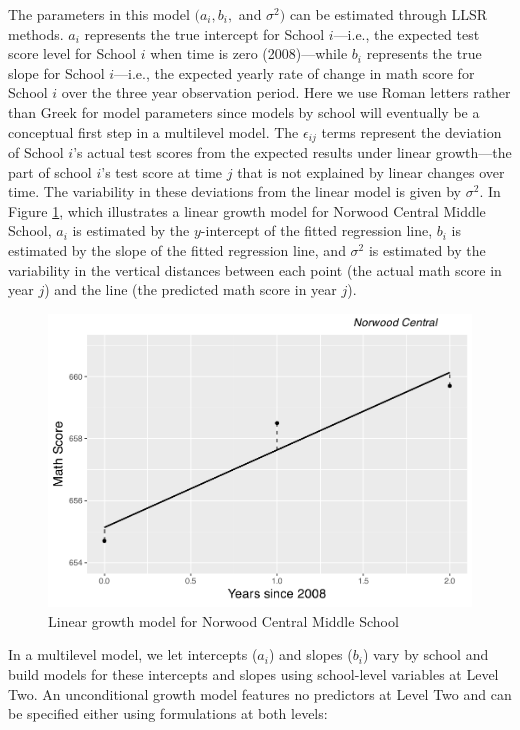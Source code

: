 \documentclass[
]{krantz}
\begin{document}
The parameters in this model \((a_{i}, b_{i},\) and \(\sigma^2)\) can be estimated through LLSR methods. \(a_{i}\) represents the true intercept for School \(i\)---i.e., the expected test score level for School \(i\) when time is zero (2008)---while \(b_{i}\) represents the true slope for School \(i\)---i.e., the expected yearly rate of change in math score for School \(i\) over the three year observation period. Here we use Roman letters rather than Greek for model parameters since models by school will eventually be a conceptual first step in a multilevel model. The \(\epsilon_{ij}\) terms represent the deviation of School \(i\)'s actual test scores from the expected results under linear growth---the part of school \(i\)'s test score at time \(j\) that is not explained by linear changes over time. The variability in these deviations from the linear model is given by \(\sigma^2\). In Figure \ref{fig:lon-scat3}, which illustrates a linear growth model for Norwood Central Middle School, \(a_{i}\) is estimated by the \(y\)-intercept of the fitted regression line, \(b_{i}\) is estimated by the slope of the fitted regression line, and \(\sigma^2\) is estimated by the variability in the vertical distances between each point (the actual math score in year \(j\)) and the line (the predicted math score in year \(j\)).

\begin{figure}

{\centering \includegraphics[width=0.6\linewidth]{bookdown-BeyondMLR_files/figure-latex/lon-scat3-1} 

}

\caption{Linear growth model for Norwood Central Middle School}\label{fig:lon-scat3}
\end{figure}

In a multilevel model, we let intercepts (\(a_{i}\)) and slopes (\(b_{i}\)) vary by school and build models for these intercepts and slopes using school-level variables at Level Two. An unconditional growth model features no predictors at Level Two and can be specified either using formulations at both levels:
\end{document}
